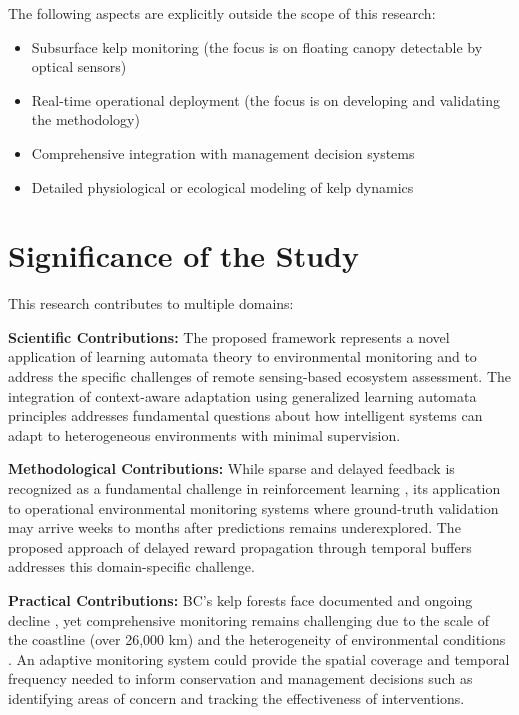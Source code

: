 \documentclass[12pt,oneside]{book}
\begin{document}
The following aspects are explicitly outside the scope of this research:

\begin{itemize}
    \item Subsurface kelp monitoring (the focus is on floating canopy detectable by optical sensors)
    \item Real-time operational deployment (the focus is on developing and validating the methodology)
    \item Comprehensive integration with management decision systems
    \item Detailed physiological or ecological modeling of kelp dynamics
\end{itemize}

\section{Significance of the Study}
\label{sec:significance}

This research contributes to multiple domains:

\textbf{Scientific Contributions:} The proposed framework represents a novel application of learning automata theory to environmental monitoring and to address the specific challenges of remote sensing-based ecosystem assessment. The integration of context-aware adaptation using generalized learning automata principles addresses fundamental questions about how intelligent systems can adapt to heterogeneous environments with minimal supervision.

\textbf{Methodological Contributions:} While sparse and delayed feedback is recognized as a fundamental challenge in reinforcement learning \citep{SuttonBarto2018}, its application to operational environmental monitoring systems where ground-truth validation may arrive weeks to months after predictions remains underexplored. The proposed approach of delayed reward propagation through temporal buffers addresses this domain-specific challenge.

\textbf{Practical Contributions:} BC's kelp forests face documented and ongoing decline \citep{Starko2024}, yet comprehensive monitoring remains challenging due to the scale of the coastline (over 26,000 km) and the heterogeneity of environmental conditions \citep{MoraSoto2024}. An adaptive monitoring system could provide the spatial coverage and temporal frequency needed to inform conservation and management decisions such as identifying areas of concern and tracking the effectiveness of interventions.
\end{document}
